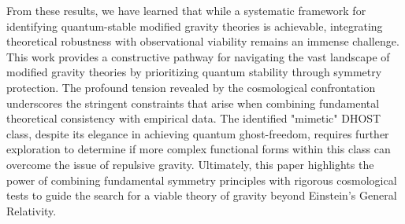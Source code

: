 \documentclass[twocolumn]{aastex631}
\begin{document}
From these results, we have learned that while a systematic framework for identifying quantum-stable modified gravity theories is achievable, integrating theoretical robustness with observational viability remains an immense challenge. This work provides a constructive pathway for navigating the vast landscape of modified gravity theories by prioritizing quantum stability through symmetry protection. The profound tension revealed by the cosmological confrontation underscores the stringent constraints that arise when combining fundamental theoretical consistency with empirical data. The identified "mimetic" DHOST class, despite its elegance in achieving quantum ghost-freedom, requires further exploration to determine if more complex functional forms within this class can overcome the issue of repulsive gravity. Ultimately, this paper highlights the power of combining fundamental symmetry principles with rigorous cosmological tests to guide the search for a viable theory of gravity beyond Einstein's General Relativity.

{}

\end{document}
